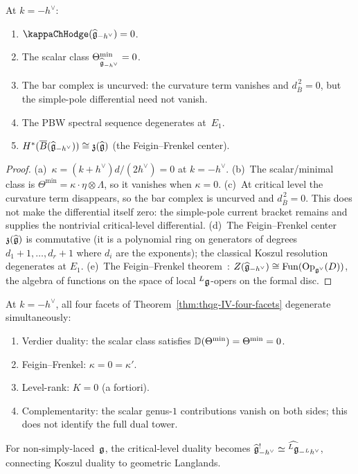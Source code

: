 \begin{theorem}
\label{thm:thqg-IV-critical-degeneration}
At $k = -h^\vee$:
\begin{enumerate}[label=\textup{(\alph*)}]
\item $\kappaChHodge(\widehat{\fg}_{-h^\vee}) = 0$.
\item The scalar class
 $\Theta^{\min}_{\widehat{\mathfrak{g}}_{-h^\vee}} = 0$.
\item The bar complex is uncurved:
 the curvature term vanishes and $d_{\bar B}^{\,2} = 0$,
 but the simple-pole differential need not vanish.
\item The PBW spectral sequence degenerates at~$E_1$.
\item $H^*(\overline{B}(\widehat{\mathfrak{g}}_{-h^\vee}))
 \cong \mathfrak{z}(\widehat{\mathfrak{g}})$
 (the Feigin--Frenkel center).
\end{enumerate}
\end{theorem}

\begin{proof}
(a)~$\kappa = (k + h^\vee)d/(2h^\vee) = 0$ at $k = -h^\vee$.
(b)~The scalar/minimal class is
$\Theta^{\min} = \kappa \cdot \eta \otimes \Lambda$, so it
vanishes when $\kappa = 0$.
(c)~At critical level the curvature term disappears, so the bar
complex is uncurved and $d_{\bar B}^{\,2} = 0$. This does not make
the differential itself zero: the simple-pole current bracket remains
and supplies the nontrivial critical-level differential.
(d)~The Feigin--Frenkel center $\mathfrak{z}(\widehat{\mathfrak{g}})$ is
commutative (it is a polynomial ring on generators of degrees
$d_1 + 1, \ldots, d_r + 1$ where $d_i$ are the exponents); the
classical Koszul resolution degenerates at $E_1$.
(e)~The Feigin--Frenkel theorem~\cite{Feigin-Frenkel}:
$Z(\widehat{\mathfrak{g}}_{-h^\vee}) \cong \mathrm{Fun}(\mathrm{Op}_{\mathfrak{g}^\vee}(D))$,
the algebra of functions on the space of local ${}^L\mathfrak{g}$-opers on the
formal disc.
\end{proof}

\begin{remark}
At $k = -h^\vee$, all four facets of
Theorem~\ref{thm:thqg-IV-four-facets} degenerate simultaneously:
\begin{enumerate}[label=\textup{(\roman*)}]
\item Verdier duality: the scalar class satisfies
 $\mathbb{D}(\Theta^{\min}) = \Theta^{\min} = 0$.
\item Feigin--Frenkel: $\kappa = 0 = \kappa'$.
\item Level-rank: $K = 0$ (a fortiori).
\item Complementarity: the scalar genus-$1$ contributions vanish on
 both sides; this does not identify the full dual tower.
\end{enumerate}
For non-simply-laced~$\mathfrak{g}$, the critical-level duality becomes
$\widehat{\mathfrak{g}}_{-h^\vee}^! \simeq
\widehat{{}^L\mathfrak{g}}_{-{}^Lh^\vee}$, connecting Koszul duality to
geometric Langlands.
\end{remark}

